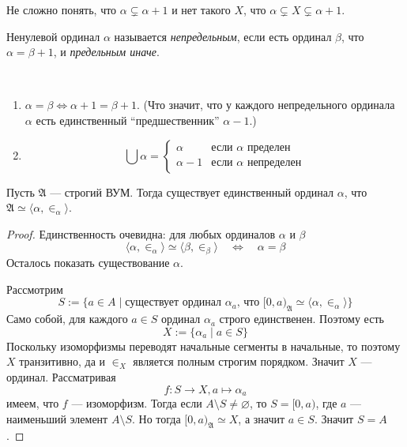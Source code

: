 \documentclass[12pt,a4paper]{article}
\begin{document}
    \begin{remark}
        Не сложно понять, что $\alpha \subsetneq \alpha + 1$ и нет такого $X$, что $\alpha \subsetneq X \subsetneq \alpha + 1$.
    \end{remark}

    \begin{definition}
        Ненулевой ординал $\alpha$ называется \emph{непредельным}, если есть ординал $\beta$, что $\alpha = \beta + 1$, и \emph{предельным иначе}.
    \end{definition}

    \begin{statement}\ 
        \begin{enumerate}
            \item $\alpha = \beta \Leftrightarrow \alpha + 1 = \beta + 1$. (Что значит, что у каждого непредельного ординала $\alpha$ есть единственный ``предшественник'' $\alpha - 1$.)
            \item \[\bigcup \alpha = \begin{cases}
                \alpha & \text{если $\alpha$ пределен}\\
                \alpha - 1 & \text{если $\alpha$ непределен}
            \end{cases}\]
        \end{enumerate}
    \end{statement}

    \begin{theorem}
        Пусть $\mathfrak{A}$ --- строгий ВУМ. Тогда существует единственный ординал $\alpha$, что $\mathfrak{A} \simeq \langle \alpha, {\in}_\alpha \rangle$.
    \end{theorem}

    \begin{proof}
        Единственность очевидна: для любых ординалов $\alpha$ и $\beta$
        \[\langle \alpha, {\in}_\alpha \rangle \simeq \langle \beta, {\in}_\beta \rangle \quad \Longleftrightarrow \quad \alpha = \beta\]
        Осталось показать существование $\alpha$.

        Рассмотрим
        \[S := \{a \in A \mid \text{существует ординал $\alpha_a$, что $[0, a)_\mathfrak{A} \simeq \langle \alpha, {\in}_\alpha \rangle$}\}\]
        Само собой, для каждого $a \in S$ ординал $\alpha_a$ строго единственен. Поэтому есть
        \[X := \{\alpha_a \mid a \in S\}\]
        Поскольку изоморфизмы переводят начальные сегменты в начальные, то поэтому $X$ транзитивно, да и $\in_X$ является полным строгим порядком. Значит $X$ --- ординал. Рассматривая
        \[f: S \to X, a \mapsto \alpha_a\]
        имеем, что $f$ --- изоморфизм. Тогда если $A \setminus S \neq \varnothing$, то $S = [0, a)$, где $a$ --- наименьший элемент $A \setminus S$. Но тогда $[0, a)_\mathfrak{A} \simeq X$, а значит $a \in S$. Значит $S = A$.
    \end{proof}
\end{document}
